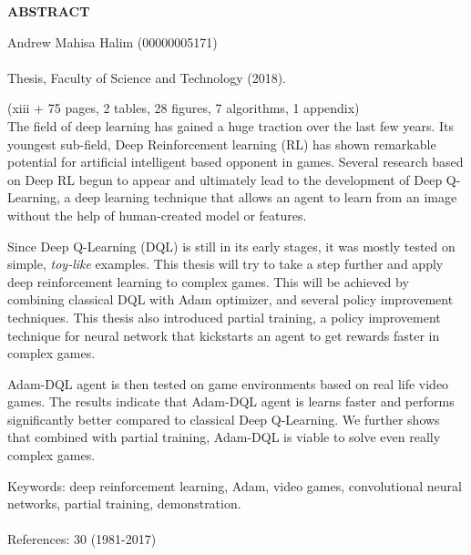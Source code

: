 \thispagestyle{fancy}
\begin{center}
\large\bfseries ABSTRACT\\
\end{center}
\noindent Andrew Mahisa Halim (00000005171)\\

 \\
\noindent Thesis, Faculty of Science and Technology (2018). \\
\begin{singlespace}

\noindent (xiii + 75 pages, 2 tables, 28 figures, 7 algorithms, 1 appendix)\\

The field of deep learning has gained a huge traction over the last few years. Its youngest sub-field, Deep Reinforcement learning (RL) has shown remarkable potential for artificial intelligent based opponent in games. Several research based on Deep RL begun to appear and ultimately lead to the development of Deep Q-Learning, a deep learning technique that allows an agent to learn from an image without the help of human-created model or features. 
\par
 Since Deep Q-Learning (DQL) is still in its early stages, it was mostly tested on simple, \textit{toy-like} examples. This thesis will try to take a step further and apply deep reinforcement learning to complex games. This will be achieved by combining classical DQL with Adam optimizer, and several policy improvement techniques. This thesis also introduced partial training, a policy improvement technique for neural network that kickstarts an agent to get rewards faster in complex games.  
\par

 Adam-DQL agent is then tested on game environments based on real life video games. The results indicate that Adam-DQL agent is learns faster and performs significantly better compared to classical Deep Q-Learning. We further shows that combined with partial training, Adam-DQL is viable to solve even really complex games. 
 
 
 
\vspace{5mm}
\noindent Keywords: deep reinforcement learning, Adam, video games, convolutional neural networks, partial training, demonstration. \\ \\
\noindent References: 30 (1981-2017)\\
\end{singlespace}